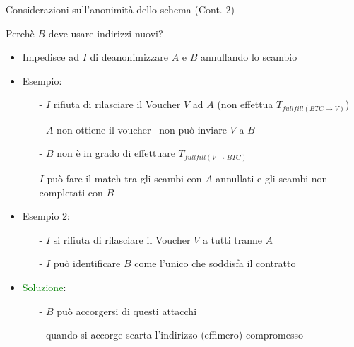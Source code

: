 \documentclass{beamer}
\begin{document}
  
  \begin{frame}{Considerazioni sull'anonimità dello schema (Cont. 2)}
      \begin{block}{Perchè $B$ deve usare indirizzi nuovi?}
          \begin{itemize}
              \item Impedisce ad $I$ di deanonimizzare $A$ e $B$ annullando lo scambio
              \item Esempio:
                \begin{itemize}
                    \item[-] $I$ rifiuta di rilasciare il Voucher $V$ ad $A$ (non effettua $T_{fullfill(BTC\rightarrow V)}$)
                    \item[-] $A$ non ottiene il voucher \MVRightarrow\, non può inviare $V$ a $B$ 
                    \item[-] $B$ non è in grado di effettuare $T_{fullfill(V\rightarrow BTC)}$
                    \item[\MVRightarrow] $I$ può fare il match tra gli scambi con $A$ annullati e gli scambi non completati con $B$ 
                \end{itemize}
                \pause
               \item Esempio 2:
               \begin{itemize}
                   \item[-] $I$ si rifiuta di rilasciare il Voucher $V$ a tutti tranne $A$
                   \item[-] $I$ può identificare $B$ come l'unico che soddisfa il contratto 
               \end{itemize}
               \pause
               \item \textcolor{green}{Soluzione}:
               \begin{itemize}
                   \item[-] $B$ può accorgersi di questi attacchi 
                   \item[-] quando si accorge scarta l'indirizzo (effimero) compromesso 
               \end{itemize}
          \end{itemize}
      \end{block}
  \end{frame}
  
  
  
\end{document}
